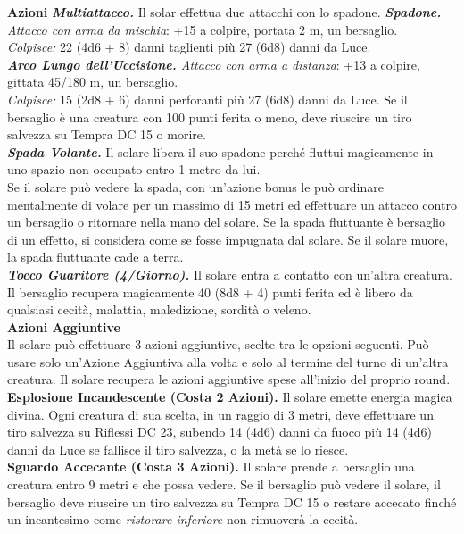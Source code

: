 \begin{multicols}{2}
\smallskip\textbf{Azioni}
\emph{\textbf{Multiattacco.}} Il solar effettua due attacchi con lo spadone.
\emph{\textbf{Spadone.} Attacco con arma da mischia}: +15 a colpire, portata 2 m, un bersaglio.\\
\emph{Colpisce:} 22 (4d6 + 8) danni taglienti più 27 (6d8) danni da Luce.\\
\emph{\textbf{Arco Lungo dell'Uccisione.} Attacco con arma a distanza}: +13 a colpire, gittata 45/180 m, un bersaglio.\\
\emph{Colpisce:} 15 (2d8 + 6) danni perforanti più 27 (6d8) danni da Luce. Se il bersaglio è una creatura con 100 punti ferita o meno, deve riuscire un tiro salvezza su Tempra DC 15 o morire. \\
\emph{\textbf{Spada Volante.}} Il solare libera il suo spadone perché fluttui magicamente in uno spazio non occupato entro 1 metro da lui.\\
Se il solare può vedere la spada, con un'azione bonus le può ordinare mentalmente di volare per un massimo di 15 metri ed effettuare un attacco contro un bersaglio o ritornare nella mano del solare. Se la spada fluttuante è bersaglio di un effetto, si considera come se fosse impugnata dal solare. Se il solare muore, la spada fluttuante cade a terra.\\
\emph{\textbf{Tocco Guaritore (4/Giorno).}} Il solare entra a contatto con  un'altra creatura. Il bersaglio recupera magicamente 40 (8d8 + 4) punti ferita ed è libero da qualsiasi cecità, malattia, maledizione, sordità o veleno.\\
\textbf{Azioni Aggiuntive}\\
Il solare può effettuare 3 azioni aggiuntive, scelte tra le opzioni seguenti. Può usare solo un'Azione Aggiuntiva alla volta e solo al termine del turno di un'altra creatura. Il solare recupera le azioni aggiuntive spese all'inizio del proprio round. \\
\textbf{Esplosione Incandescente (Costa 2 Azioni).} Il solare emette energia magica divina. Ogni creatura di sua scelta, in un raggio di 3 metri, deve effettuare un tiro salvezza su Riflessi DC 23, subendo 14 (4d6) danni da fuoco più 14 (4d6) danni da Luce se fallisce il tiro salvezza, o la metà se lo riesce. \\ 
\textbf{Sguardo Accecante (Costa 3 Azioni).} Il solare prende a bersaglio una creatura entro 9 metri e che possa vedere. Se il bersaglio può vedere il solare, il bersaglio deve riuscire un tiro salvezza su Tempra DC 15 o restare accecato finché un incantesimo come \emph{ristorare inferiore} non rimuoverà la cecità.\\

\end{multicols}
